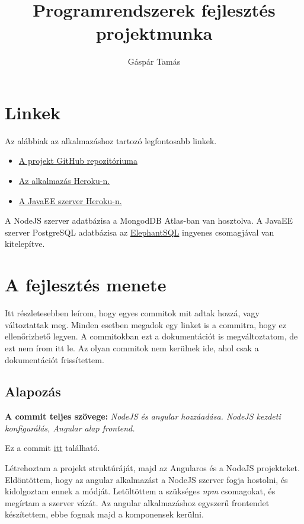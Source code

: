\documentclass[]{article}
\title{Programrendszerek fejlesztés projektmunka}
\author{Gáspár Tamás}
\begin{document}
\maketitle

\tableofcontents

\section{Linkek}

Az alábbiak az alkalmazáshoz tartozó legfontosabb linkek.

\begin{itemize}
	\item \href{https://github.com/Gtomika/prf-project}{A projekt GitHub repozitóriuma}
	\item \href{https://prf-project-gaspar.herokuapp.com}{Az alkalmazás Heroku-n.}
	\item \href{https://prf-project-gaspar-javaee.herokuapp.com}{A JavaEE szerver Heroku-n.}
\end{itemize}

A NodeJS szerver adatbázisa a MongodDB Atlas-ban van hosztolva. A JavaEE szerver PostgreSQL adatbázisa az \href{https://www.elephantsql.com/}{ElephantSQL} ingyenes csomagjával van kitelepítve.

\section{A fejlesztés menete}

Itt részletesebben leírom, hogy egyes commitok mit adtak hozzá, vagy változtattak meg. Minden esetben megadok egy linket is a 
commitra, hogy ez ellenőrizhető legyen. A commitokban ezt a dokumentációt is megváltoztatom, de ezt nem írom itt le. Az olyan commitok nem kerülnek ide, ahol csak a dokumentációt frissítettem. 

\subsection{Alapozás}

\noindent
\textbf{A commit teljes szövege:} \textit{NodeJS és angular hozzáadása. NodeJS kezdeti konfigurálás, Angular alap frontend.}

\bigskip
\noindent
Ez a commit \href{https://github.com/Gtomika/prf-project/commit/170975c76199384bc0c8c9524929d8804e70a56d}{itt} található.
\bigskip

Létrehoztam a projekt struktúráját, majd az Angularos és a NodeJS projekteket. Eldöntöttem, hogy az angular alkalmazást a NodeJS szerver fogja hostolni, és kidolgoztam ennek a módját. 
Letöltöttem a szükséges \textit{npm} csomagokat, és megírtam a szerver vázát. Az angular alkalmazáshoz egyszerű frontendet készítettem, ebbe fognak majd a komponensek kerülni.
\end{document}
